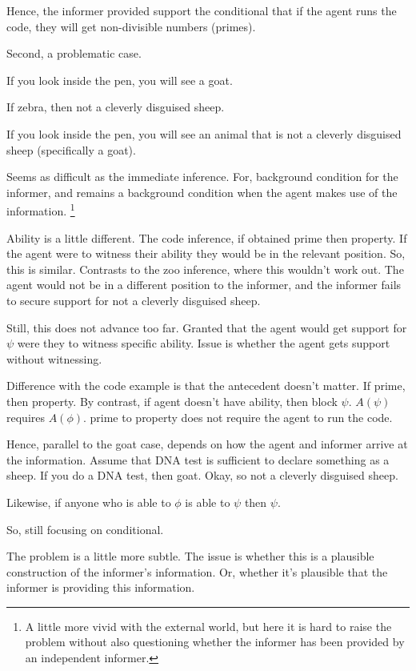 \documentclass[10pt]{article}
\begin{document}
Hence, the informer provided support the conditional that if the agent runs the code, they will get non-divisible numbers (primes).

Second, a problematic case.

If you look inside the pen, you will see a goat.

If zebra, then not a cleverly disguised sheep.

If you look inside the pen, you will see an animal that is not a cleverly disguised sheep (specifically a goat).

Seems as difficult as the immediate inference.
For, background condition for the informer, and remains a background condition when the agent makes use of the information.\nolinebreak
\footnote{
  A little more vivid with the external world, but here it is hard to raise the problem without also questioning whether the informer has been provided by an independent informer.
}

Ability is a little different.
The code inference, if obtained prime then property.
If the agent were to witness their ability they would be in the relevant position.
So, this is similar.
Contrasts to the zoo inference, where this wouldn't work out.
The agent would not be in a different position to the informer, and the informer fails to secure support for not a cleverly disguised sheep.

Still, this does not advance too far.
Granted that the agent would get support for \(\psi\) were they to witness specific ability.
Issue is whether the agent gets support without witnessing.

Difference with the code example is that the antecedent doesn't matter.
If prime, then property.
By contrast, if agent doesn't have ability, then block \(\psi\).
\(A(\psi)\) requires \(A(\phi)\).
prime to property does not require the agent to run the code.

Hence, parallel to the goat case, depends on how the agent and informer arrive at the information.
Assume that DNA test is sufficient to declare something as a sheep.
If you do a DNA test, then goat.
Okay, so not a cleverly disguised sheep.

Likewise, if anyone who is able to \(\phi\) is able to \(\psi\) then \(\psi\).

So, still focusing on conditional.

The problem is a little more subtle.
The issue is whether this is a plausible construction of the informer's information.
Or, whether it's plausible that the informer is providing this information.
\end{document}
